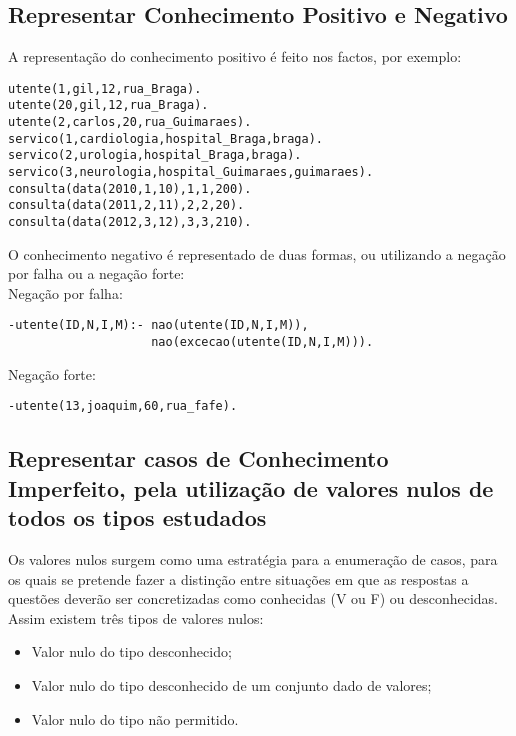 \subsection{Representar Conhecimento Positivo e Negativo}

A representação do conhecimento positivo é feito nos factos, por exemplo:

\begin{verbatim}
utente(1,gil,12,rua_Braga).
utente(20,gil,12,rua_Braga).
utente(2,carlos,20,rua_Guimaraes).
servico(1,cardiologia,hospital_Braga,braga).
servico(2,urologia,hospital_Braga,braga).
servico(3,neurologia,hospital_Guimaraes,guimaraes). 
consulta(data(2010,1,10),1,1,200).
consulta(data(2011,2,11),2,2,20).
consulta(data(2012,3,12),3,3,210).
\end{verbatim}

O conhecimento negativo é representado de duas formas, ou utilizando a negação por falha ou a negação forte: \\


Negação por falha: 
\begin{verbatim}
-utente(ID,N,I,M):- nao(utente(ID,N,I,M)),
					nao(excecao(utente(ID,N,I,M))).
\end{verbatim}

Negação forte: 
\begin{verbatim}
-utente(13,joaquim,60,rua_fafe). 
\end{verbatim}



\subsection{Representar casos de Conhecimento Imperfeito, pela utilização de valores nulos de todos os tipos estudados}

Os valores nulos surgem como uma estratégia para a enumeração de casos, para os quais se pretende fazer a distinção entre situações em que as respostas a questões deverão ser concretizadas como conhecidas (V ou F) ou desconhecidas. 
Assim existem três tipos de valores nulos:

\begin{itemize}
	\item Valor nulo do tipo desconhecido;	
	\item Valor nulo do tipo desconhecido de um conjunto dado de valores;
	\item Valor nulo do tipo não permitido. 
\end{itemize}

